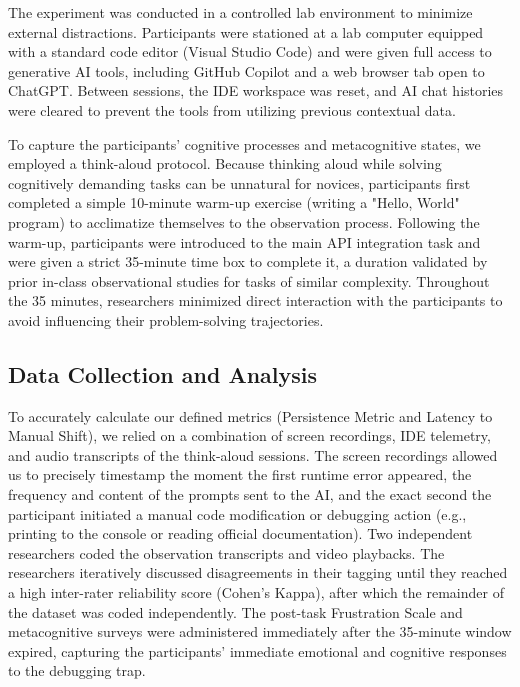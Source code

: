 \documentclass[../main.tex]{subfiles}
\begin{document}
The experiment was conducted in a controlled lab environment to minimize external distractions. Participants were stationed at a lab computer equipped with a standard code editor (Visual Studio Code) and were given full access to generative AI tools, including GitHub Copilot and a web browser tab open to ChatGPT. 
Between sessions, the IDE workspace was reset, and AI chat histories were cleared to prevent the tools from utilizing previous contextual data.
\par To capture the participants' cognitive processes and metacognitive states, we employed a think-aloud protocol. 
Because thinking aloud while solving cognitively demanding tasks can be unnatural for novices, participants first 
completed a simple 10-minute warm-up exercise (writing a "Hello, World" program) to acclimatize themselves to the 
observation process. Following the warm-up, participants were introduced to the main API integration task and were given 
a strict 35-minute time box to complete it, a duration validated by prior in-class observational studies for tasks 
of similar complexity. Throughout the 35 minutes, researchers minimized direct interaction with the participants 
to avoid influencing their problem-solving trajectories.

\subsection{Data Collection and Analysis}

To accurately calculate our defined metrics (Persistence Metric and Latency to Manual Shift), we relied 
on a combination of screen recordings, IDE telemetry, and audio transcripts of the think-aloud sessions.
The screen recordings allowed us to precisely timestamp the moment the first runtime error appeared, the frequency and content of the prompts sent to the AI, and the exact second the participant initiated a manual code modification or debugging action (e.g., printing to the console or reading official documentation). 
Two independent researchers coded the observation transcripts and video playbacks. 
The researchers iteratively discussed disagreements in their tagging until they reached a high inter-rater 
reliability score (Cohen's Kappa), after which the remainder of the dataset was coded independently. 
The post-task Frustration Scale and metacognitive surveys were administered immediately after the 35-minute 
window expired, capturing the participants' immediate emotional and cognitive responses to the debugging trap.
\end{document}
